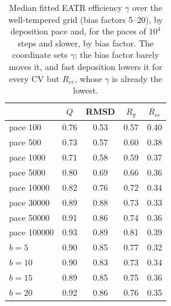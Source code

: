 \begin{table}[H]\centering
\caption{Median fitted EATR efficiency $\gamma$ over the well-tempered grid (bias factors 5--20), by deposition pace and, for the paces of $10^4$ steps and slower, by bias factor. The coordinate sets $\gamma$; the bias factor barely moves it, and fast deposition lowers it for every CV but $R_{ee}$, whose $\gamma$ is already the lowest.}\label{tab:s17}
\begin{tabular}{lcccc}\toprule
& $Q$ & RMSD & $R_g$ & $R_{ee}$\\ \midrule
pace 100 & 0.76 & 0.53 & 0.57 & 0.40 \\
pace 500 & 0.73 & 0.57 & 0.60 & 0.38 \\
pace 1000 & 0.71 & 0.58 & 0.59 & 0.37 \\
pace 5000 & 0.80 & 0.69 & 0.66 & 0.36 \\
pace 10000 & 0.82 & 0.76 & 0.72 & 0.34 \\
pace 30000 & 0.89 & 0.88 & 0.73 & 0.33 \\
pace 50000 & 0.91 & 0.86 & 0.74 & 0.36 \\
pace 100000 & 0.93 & 0.89 & 0.81 & 0.39 \\
\midrule $b = 5$ & 0.90 & 0.85 & 0.77 & 0.32 \\
$b = 10$ & 0.90 & 0.83 & 0.73 & 0.34 \\
$b = 15$ & 0.89 & 0.85 & 0.75 & 0.36 \\
$b = 20$ & 0.92 & 0.86 & 0.76 & 0.35\\ \bottomrule
\end{tabular}
\end{table}
